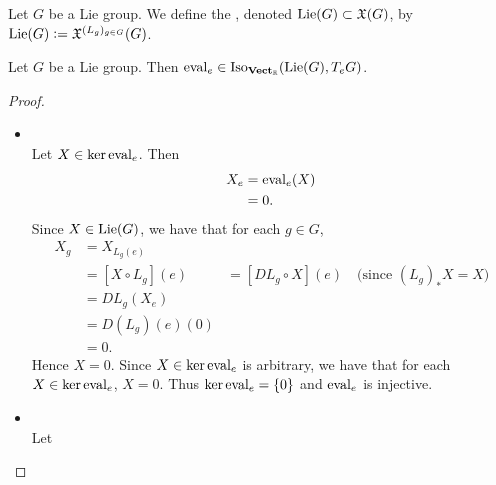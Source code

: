 \documentclass{book}
\begin{document}
\begin{defn} 
	Let $G$ be a Lie group. We define the , denoted $\text{Lie}(G) \subset \mathfrak{X}(G)$, by $\text{Lie}(G) \vcentcolon= \mathfrak{X}^{(L_g)_{g \in G}}(G)$. 
\end{defn}

\begin{ex}
	Let $G$ be a Lie group. Then $\text{eval}_e \in \operatorname{Iso}_{\operatorname*{\text{\textbf{Vect}}_{\mathbb{R}}}}(\text{Lie}(G), T_eG)$.
\end{ex}

\begin{proof}
	\begin{itemize}
		\item {} \\
		Let $X \in \ker \text{eval}_e$. Then 
		\begin{align*}
			X_e
			& = \text{eval}_e(X) \\
			& = 0.
		\end{align*}
		Since $X \in \text{Lie}(G)$, we have that for each $g \in G$, 
		\begin{align*}
			X_g
			& = X_{L_g(e)} \\
			& = [X \circ L_g](e)
			& = [DL_g \circ X](e) \quad \text{(since $(L_g)_*X = X$)} \\
			& = DL_g(X_e) \\
			& = D(L_g)(e)(0) \\
			& = 0. 
		\end{align*}
		Hence $X = 0$. Since $X \in \ker \text{eval}_e$ is arbitrary, we have that for each $X \in \ker \text{eval}_e$, $X = 0$. Thus $\ker \text{eval}_e = \{0\}$ and $\text{eval}_e$ is injective.  
		\item {} \\
		Let 
	\end{itemize}
\end{proof}
\end{document}
